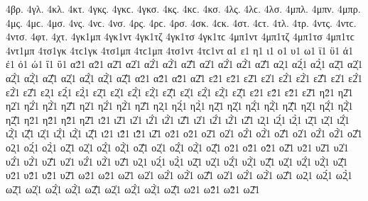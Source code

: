 {%
4βρ.   %
4γλ.   %
4κλ.   %
4κτ.   %
4γκς. 4γκϲ.   %
4γκσ. 
4κς. 4κϲ.   %
4κσ. 
4λς. 4λϲ.   %
4λσ. 
4μπλ.   %
4μπν.   %
4μπρ.   %
4μς. 4μϲ.   %
4μσ. 
4νς. 4νϲ.   %
4νσ. 
4ρς. 4ρϲ.   %
4ρσ. 
4σκ. 4ϲκ.   %
4στ. 4ϲτ.   %
4τλ.   %
4τρ.   %
4ντς. 4ντϲ.   %
4ντσ. 
4φτ.   %
4χτ.   %
4γκ1μπ 
4γκ1ντ 
4γκ1τζ 
4γκ1τσ 4γκ1τϲ 
4μπ1ντ 
4μπ1τζ 
4μπ1τσ 4μπ1τϲ 
4ντ1μπ 
4τσ1γκ 4τϲ1γκ 
4τσ1μπ 4τϲ1μπ 
4τσ1ντ 4τϲ1ντ 
α1 ε1 η1 ι1 ο1 υ1 ω1 ϊ1 ϋ1 ά1 έ1 ό1 ώ1 ΐ1 ΰ1 α2́1 α2̀1 α2͂1 α2̓1 α2̓́1 α2̓̀1 α2̓͂1 α2̔1 α2̔́1 α2̔̀1 α2̔͂1 α2ͅ1 α2́ͅ1 α2̀ͅ1 α2͂ͅ1 α2̓ͅ1 α2̓́ͅ1 α2̓̀ͅ1 α2̓͂ͅ1 α2̔ͅ1 α2̔́ͅ1 α2̔̀ͅ1 α2̔͂ͅ1 α2̈1 α2̈́1 α2̈̀1 α2̈͂1 ε2́1 ε2̀1 ε2͂1 ε2̓1 ε2̓́1 ε2̓̀1 ε2̓͂1 ε2̔1 ε2̔́1 ε2̔̀1 ε2̔͂1 ε2ͅ1 ε2́ͅ1 ε2̀ͅ1 ε2͂ͅ1 ε2̓ͅ1 ε2̓́ͅ1 ε2̓̀ͅ1 ε2̓͂ͅ1 ε2̔ͅ1 ε2̔́ͅ1 ε2̔̀ͅ1 ε2̔͂ͅ1 ε2̈1 ε2̈́1 ε2̈̀1 ε2̈͂1 η2̀1 η2͂1 η2̓1 η2̓́1 η2̓̀1 η2̓͂1 η2̔1 η2̔́1 η2̔̀1 η2̔͂1 η2ͅ1 η2́ͅ1 η2̀ͅ1 η2͂ͅ1 η2̓ͅ1 η2̓́ͅ1 η2̓̀ͅ1 η2̓͂ͅ1 η2̔ͅ1 η2̔́ͅ1 η2̔̀ͅ1 η2̔͂ͅ1 η2̈1 η2̈́1 η2̈̀1 η2̈͂1 ι2̀1 ι2͂1 ι2̓1 ι2̓́1 ι2̓̀1 ι2̓͂1 ι2̔1 ι2̔́1 ι2̔̀1 ι2̔͂1 ι2ͅ1 ι2́ͅ1 ι2̀ͅ1 ι2͂ͅ1 ι2̓ͅ1 ι2̓́ͅ1 ι2̓̀ͅ1 ι2̓͂ͅ1 ι2̔ͅ1 ι2̔́ͅ1 ι2̔̀ͅ1 ι2̔͂ͅ1 ι2̈1 ι2̈́1 ι2̈̀1 ι2̈͂1 ο2́1 ο2̀1 ο2͂1 ο2̓1 ο2̓́1 ο2̓̀1 ο2̓͂1 ο2̔1 ο2̔́1 ο2̔̀1 ο2̔͂1 ο2ͅ1 ο2́ͅ1 ο2̀ͅ1 ο2͂ͅ1 ο2̓ͅ1 ο2̓́ͅ1 ο2̓̀ͅ1 ο2̓͂ͅ1 ο2̔ͅ1 ο2̔́ͅ1 ο2̔̀ͅ1 ο2̔͂ͅ1 ο2̈1 ο2̈́1 ο2̈̀1 ο2̈͂1 υ2̀1 υ2͂1 υ2̓1 υ2̓́1 υ2̓̀1 υ2̓͂1 υ2̔1 υ2̔́1 υ2̔̀1 υ2̔͂1 υ2ͅ1 υ2́ͅ1 υ2̀ͅ1 υ2͂ͅ1 υ2̓ͅ1 υ2̓́ͅ1 υ2̓̀ͅ1 υ2̓͂ͅ1 υ2̔ͅ1 υ2̔́ͅ1 υ2̔̀ͅ1 υ2̔͂ͅ1 υ2̈1 υ2̈́1 υ2̈̀1 υ2̈͂1 ω2́1 ω2̀1 ω2͂1 ω2̓1 ω2̓́1 ω2̓̀1 ω2̓͂1 ω2̔1 ω2̔́1 ω2̔̀1 ω2̔͂1 ω2ͅ1 ω2́ͅ1 ω2̀ͅ1 ω2͂ͅ1 ω2̓ͅ1 ω2̓́ͅ1 ω2̓̀ͅ1 ω2̓͂ͅ1 ω2̔ͅ1 ω2̔́ͅ1 ω2̔̀ͅ1 ω2̔͂ͅ1 ω2̈1 ω2̈́1 ω2̈̀1 ω2̈͂1 
}
\endgroup
\endinput
